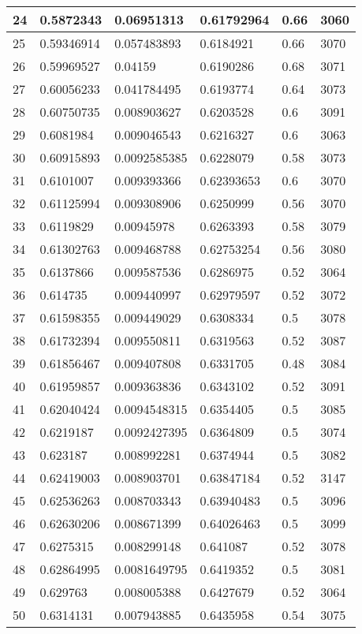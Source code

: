 \begin{longtable}{|l|l|l|l|l|l|}
24 & 0.5872343 & 0.06951313 & 0.61792964 & 0.66 & 3060 \\ \hline 
25 & 0.59346914 & 0.057483893 & 0.6184921 & 0.66 & 3070 \\ \hline 
26 & 0.59969527 & 0.04159 & 0.6190286 & 0.68 & 3071 \\ \hline 
27 & 0.60056233 & 0.041784495 & 0.6193774 & 0.64 & 3073 \\ \hline 
28 & 0.60750735 & 0.008903627 & 0.6203528 & 0.6 & 3091 \\ \hline 
29 & 0.6081984 & 0.009046543 & 0.6216327 & 0.6 & 3063 \\ \hline 
30 & 0.60915893 & 0.0092585385 & 0.6228079 & 0.58 & 3073 \\ \hline 
31 & 0.6101007 & 0.009393366 & 0.62393653 & 0.6 & 3070 \\ \hline 
32 & 0.61125994 & 0.009308906 & 0.6250999 & 0.56 & 3070 \\ \hline 
33 & 0.6119829 & 0.00945978 & 0.6263393 & 0.58 & 3079 \\ \hline 
34 & 0.61302763 & 0.009468788 & 0.62753254 & 0.56 & 3080 \\ \hline 
35 & 0.6137866 & 0.009587536 & 0.6286975 & 0.52 & 3064 \\ \hline 
36 & 0.614735 & 0.009440997 & 0.62979597 & 0.52 & 3072 \\ \hline 
37 & 0.61598355 & 0.009449029 & 0.6308334 & 0.5 & 3078 \\ \hline 
38 & 0.61732394 & 0.009550811 & 0.6319563 & 0.52 & 3087 \\ \hline 
39 & 0.61856467 & 0.009407808 & 0.6331705 & 0.48 & 3084 \\ \hline 
40 & 0.61959857 & 0.009363836 & 0.6343102 & 0.52 & 3091 \\ \hline 
41 & 0.62040424 & 0.0094548315 & 0.6354405 & 0.5 & 3085 \\ \hline 
42 & 0.6219187 & 0.0092427395 & 0.6364809 & 0.5 & 3074 \\ \hline 
43 & 0.623187 & 0.008992281 & 0.6374944 & 0.5 & 3082 \\ \hline 
44 & 0.62419003 & 0.008903701 & 0.63847184 & 0.52 & 3147 \\ \hline 
45 & 0.62536263 & 0.008703343 & 0.63940483 & 0.5 & 3096 \\ \hline 
46 & 0.62630206 & 0.008671399 & 0.64026463 & 0.5 & 3099 \\ \hline 
47 & 0.6275315 & 0.008299148 & 0.641087 & 0.52 & 3078 \\ \hline 
48 & 0.62864995 & 0.0081649795 & 0.6419352 & 0.5 & 3081 \\ \hline 
49 & 0.629763 & 0.008005388 & 0.6427679 & 0.52 & 3064 \\ \hline 
50 & 0.6314131 & 0.007943885 & 0.6435958 & 0.54 & 3075 \\ \hline 
\end{longtable}